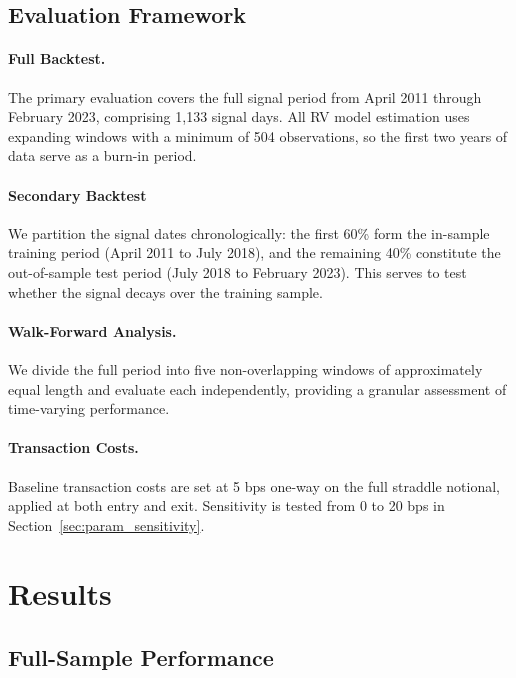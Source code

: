 \documentclass[11pt,a4paper]{article}
\begin{document}
\subsection{Evaluation Framework}

\paragraph{Full Backtest.}
The primary evaluation covers the full signal period from April 2011 through February 2023, comprising 1{,}133 signal days. All RV model estimation uses expanding windows with a minimum of 504 observations, so the first two years of data serve as a burn-in period.

\paragraph{Secondary Backtest}
We partition the signal dates chronologically: the first 60\% form the in-sample training period (April 2011 to July 2018), and the remaining 40\% constitute the out-of-sample test period (July 2018 to February 2023). This serves to test whether the signal decays over the training sample.

\paragraph{Walk-Forward Analysis.}
We divide the full period into five non-overlapping windows of approximately equal length and evaluate each independently, providing a granular assessment of time-varying performance.

\paragraph{Transaction Costs.}
Baseline transaction costs are set at 5 bps one-way on the full straddle notional, applied at both entry and exit.
Sensitivity is tested from 0 to 20 bps in Section~\ref{sec:param_sensitivity}.


\section{Results}

\subsection{Full-Sample Performance}
\end{document}
